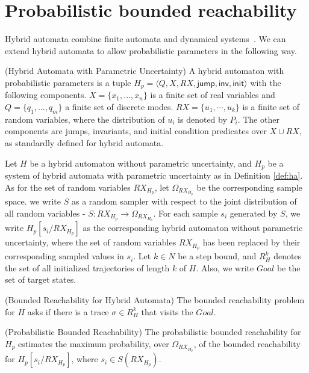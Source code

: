\section{Probabilistic bounded reachability}

Hybrid automata combine finite automata and dynamical systems~\cite{henzinger2000theory}. We can extend hybrid automata to allow probabilistic parameters in the following way. 

\begin{definition}
\label{def:ha}
{\rm(Hybrid Automata with Parametric Uncertainty)} A hybrid automaton with probabilistic parameters is a tuple $H_p = \langle Q,X,RX,\mathsf{jump},\mathsf{inv},\mathsf{init}\rangle$
with the following components. $X = \{x_1,...,x_n\}$ is a finite set of real variables and $Q=\{q_1,...,q_m\}$ a finite set of discrete modes. $RX = \{ u_1, \cdots, u_k \}$ is a finite set of random variables, where the distribution of $u_i$ is denoted by $P_i$. The other components are jumps, invariants, and initial condition predicates over $X\cup RX$, as standardly defined for hybrid automata.
\end{definition}
Let $H$ be a hybrid automaton without parametric uncertainty, and $H_p$ be a system of hybrid automata with parametric uncertainty as in Definition \ref{def:ha}. As for the set of random variables $RX_{H_p}$, let $\Omega_{RX_{H_p}}$ be the corresponding sample space. we write $S$ as a random sampler with respect to the joint distribution of all random variables - $S: RX_{H_p} \to \Omega_{RX_{H_p}}$. For each sample $s_i$ generated by $S$, we write $H_{p}[s_i/RX_{H_p}]$ as the corresponding hybrid automaton without parametric uncertainty, where the set of random variables $RX_{H_p}$ has been replaced by their corresponding sampled values in $s_i$. Let $k \in N$ be a step bound, and $R_{H}^k$ denotes the set of all initialized trajectories of length $k$ of $H$. Also, we write $Goal$ be the set of target states.
\begin{remark}
\label{def:br}
{\rm (Bounded Reachability for Hybrid Automata)}
The bounded reachability problem for $H$ asks if there is a trace $\sigma \in R_{H}^k$ that visits the $Goal$.
\end{remark}
\begin{definition}
\label{def:pbr}
{\rm (Probabilistic Bounded Reachability)}
The probabilistic bounded reachability for $H_p$ estimates the maximum probability, over $\Omega_{RX_{H_p}}$, of the bounded reachability for $H_{p}[s_i/RX_{H_p}]$, where $s_i \in S(RX_{H_p})$.
\end{definition}
